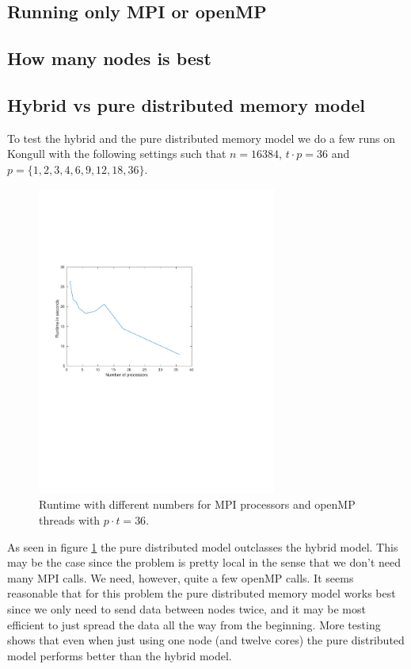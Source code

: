 
\subsection*{Running only MPI or openMP}



\subsection*{How many nodes is best}

\subsection*{Hybrid vs pure distributed memory model}

To test the hybrid and the pure distributed memory model we do a few runs on Kongull with the following settings such that $n = 16384$,  $t\cdot p = 36$ and $p = \{1, 2, 3, 4, 6, 9, 12, 18, 36\}$.
\begin{figure}
\centering
\includegraphics[width=0.7\textwidth]{./figures/runtime}
\caption{Runtime with different numbers for MPI processors and openMP threads with $p\cdot t = 36$.}
\label{fig:runtime}
\end{figure}
As seen in figure \ref{fig:runtime} the pure distributed model outclasses the hybrid model. This may be the case since the problem is pretty local in the sense that we don't need many MPI calls. We need, however, quite a few openMP calls. It seems reasonable that for this problem the pure distributed memory model works best since we only need to send data between nodes twice, and it may be most efficient to just spread the data all the way from the beginning. More testing shows that even when just using one node (and twelve cores) the pure distributed model performs better than the hybrid model.


